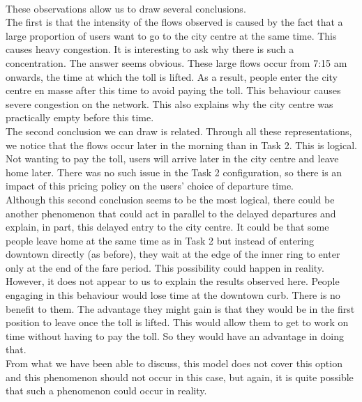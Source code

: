 \documentclass[a4paper, 12pt,oneside]{article}
\begin{document}
\\

These observations allow us to draw several conclusions.\\

The first is that the intensity of the flows observed is caused by the fact that a large proportion of users want to go to the city centre at the same time. This causes heavy congestion. It is interesting to ask why there is such a concentration. The answer seems obvious. These large flows occur from 7:15 am onwards, the time at which the toll is lifted. As a result, people enter the city centre en masse after this time to avoid paying the toll. This behaviour causes severe congestion on the network. This also explains why the city centre was practically empty before this time.\\

The second conclusion we can draw is related. Through all these representations, we notice that the flows occur later in the morning than in Task 2. This is logical. Not wanting to pay the toll, users will arrive later in the city centre and leave home later. There was no such issue in the Task 2 configuration, so there is an impact of this pricing policy on the users' choice of departure time.\\

Although this second conclusion seems to be the most logical, there could be another phenomenon that could act in parallel to the delayed departures and explain, in part, this delayed entry to the city centre. It could be that some people leave home at the same time as in Task 2 but instead of entering downtown directly (as before), they wait at the edge of the inner ring to enter only at the end of the fare period. This possibility could happen in reality. However, it does not appear to us to explain the results observed here. People engaging in this behaviour would lose time at the downtown curb. There is no benefit to them. The advantage they might gain is that they would be in the first position to leave once the toll is lifted. This would allow them to get to work on time without having to pay the toll. So they would have an advantage in doing that.\\

From what we have been able to discuss, this model does not cover this option and this phenomenon should not occur in this case, but again, it is quite possible that such a phenomenon could occur in reality.\\
\end{document}

